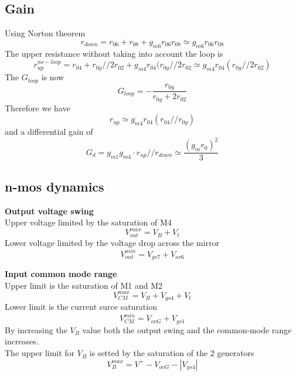 \subsection{Gain}
Using Norton theorem
\begin{equation}
r_{down}=r_{06}+r_{08}+g_{m6}r_{06}r_{08}\simeq g_{m6}r_{06}r_{08}
\end{equation}
The upper resistance without taking into account the loop is 
\begin{equation}
r_{up}^{no-loop}=r_{04}+r_{0g}//2r_{02}+g_{m4}r_{04}(r_{0g}//2r_{02}\simeq g_{m4}r_{04}(r_{0g}//2r_{02})
\end{equation}
The $G_{loop}$ is now 
\begin{equation}
G_{loop}=-\frac{r_{0g}}{r_{0g}+2r_{02}}
\end{equation}
Therefore we have 
\begin{equation}
r_{up}\simeq g_{m4}r_{04}(r_{04}//r_{0g})
\end{equation}
and a differential gain of 
\begin{equation}
G_d=g_{m1}g_{m4}\cdot r_{up}//r_{down}\simeq \frac{(g_mr_0)^2}{3}
\end{equation}

\subsection{n-mos dynamics}

{\bf Output voltage swing}\\
Upper voltage limited by the saturation of M4
\begin{equation}
V_{out}^{max}=V_B+V_t
\end{equation}
Lower voltage limited by the voltage drop across the mirror
\begin{equation}
V_{out}^{min}=V_{gs7}+V_{ov6}
\end{equation}

{\bf Input common mode range}\\
Upper limit is the saturation of M1 and M2
\begin{equation}
V_{CM}^{max}=V_B+V_{gs4}+V_t
\end{equation}
Lower limit is the current surce saturation
\begin{equation}
V_{CM}^{min}=V_{ovG}+V_{gs1}
\end{equation}
By increasing the $V_B$ value both the output swing and the common-mode range increases.\\
The upper limit for $V_B$ is setted by the saturation of the 2 generators
\begin{equation}
V_{B}^{max}=V^+-V_{ovG}-|V_{gs4}|
\end{equation}

